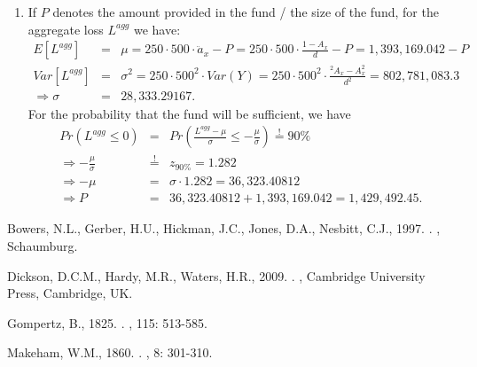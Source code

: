 \documentclass[11pt,fleqn,oneside]{book}
\begin{document}
\begin{enumerate}
\item If $P$ denotes the amount provided in the fund / the size of the fund, for the aggregate loss $L^{agg}$ we have: 
\begin{eqnarray*}
E\left[L^{agg}\right] &=& \mu = 250 \cdot 500 \cdot \ddot{a}_x - P = 250 \cdot 500 \cdot \frac{1 - A_x}{d} - P = 1,393,169.042 - P\\
Var\left[L^{agg}\right] &=& \sigma^2 = 250 \cdot 500^2 \cdot Var(Y) = 250 \cdot 500^2 \cdot 
\frac{{^2A_x} - A_x^2}{d^2} = 802,781,083.3\\
\Rightarrow \sigma &=& 28,333.29167.
\end{eqnarray*}
For the probability that the fund will be sufficient, we have
\begin{eqnarray*}
Pr\left(L^{agg} \leq 0 \right) &=& Pr\left( \frac{L^{agg} - \mu}{\sigma} \leq -\frac{\mu}{\sigma}\right) \stackrel{!}{=} 90\%\\
\Rightarrow - \frac{\mu}{\sigma} &\stackrel{!}{=}& z_{90\%} = 1.282\\
\Rightarrow -\mu &=& \sigma \cdot 1.282 = 36,323.40812\\
\Rightarrow P &=& 36,323.40812 + 1,393,169.042  = 1,429,492.45.
\end{eqnarray*}
\end{enumerate}
\normalsize



\backmatter     %

\begin{thebibliography}{XX}
Bowers, N.L., Gerber, H.U., Hickman, J.C., Jones, D.A., Nesbitt, C.J., 1997.
.
, {Schaumburg}.

Dickson, D.C.M., Hardy, M.R., Waters, H.R., 2009.
.
, {Cambridge University Press}, {Cambridge}, {UK}.

Gompertz, B., 1825. 
.
, 115: {513-585}.

Makeham, W.M., 1860.
.
, 8: {301-310}.

\end{thebibliography}
\end{document}
